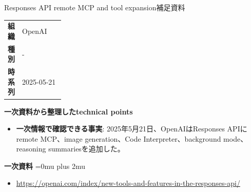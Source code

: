 \begin{technicalnote}{Responses API remote MCP and tool expansion}{補足資料}
\begingroup
\begin{tabularx}{\linewidth}{@{}>{\bfseries}p{0.22\linewidth}X@{}}
組織 & OpenAI \\
種別 & - \\
時系列 & 2025-05-21 \\
\end{tabularx}
\smallskip
{\bfseries 一次資料から整理したtechnical points}
\begin{itemize}[leftmargin=1.5em,itemsep=0.35em]
\item \textbf{一次情報で確認できる事実}: 2025年5月21日、OpenAIはResponses APIにremote MCP、image generation、Code Interpreter、background mode、reasoning summariesを追加した。
\end{itemize}
\begin{samepage}
{\bfseries 一次資料}
\begingroup\sloppy
\Urlmuskip=0mu plus 2mu\relax
\begin{itemize}[leftmargin=1.5em,itemsep=0.25em]
\item {\scriptsize\url{https://openai.com/index/new-tools-and-features-in-the-responses-api/}}
\end{itemize}
\endgroup
\end{samepage}
\endgroup
\end{technicalnote}
\medskip
